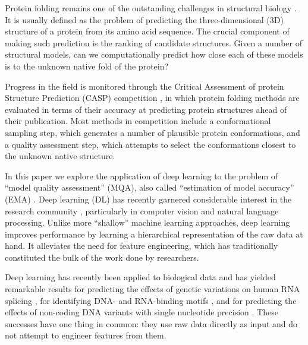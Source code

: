 
Protein folding remains one of the outstanding challenges in
structural biology \cite{dill2012folding}. 
It is usually defined as the problem of predicting the three-dimensional (3D) structure of a
protein from its amino acid sequence. The crucial component of making such prediction is 
the ranking of candidate structures. Given a number of structural models, 
can we computationally predict how close each of these models is to the unknown native fold of the protein?

Progress in the field is monitored through the Critical Assessment of
protein Structure Prediction (CASP) competition \cite{moult1995large},
in which protein folding methods are evaluated in terms of their
accuracy at predicting protein structures ahead of their
publication. Most methods in competition include a conformational
sampling step, which generates a number of plausible protein
conformations, and a quality assessment step, which attempts to select
the conformations closest to the unknown native structure.

In this paper we explore the application of deep learning to the
problem of ``model quality assessment'' (MQA), also called
``estimation of model accuracy'' (EMA) \cite{kryshtafovych2015}. Deep
learning (DL) has recently garnered considerable interest in the
research community \cite{lecun2015deep}, particularly in computer
vision and natural language processing. Unlike more ``shallow''
machine learning approaches, deep learning improves performance by
learning a hierarchical representation of the raw data at hand. It
alleviates the need for feature engineering, which has traditionally
constituted the bulk of the work done by researchers.

Deep learning has recently been applied to biological data and has
yielded remarkable results for predicting the effects of genetic
variations on human RNA splicing \cite{xiong2015human}, for
identifying DNA- and RNA-binding
motifs \cite{alipanahi2015predicting}, and for predicting the effects
of non-coding DNA variants with single nucleotide
precision \cite{zhou2015predicting}. These successes have one thing in
common: they use raw data directly as input and do not attempt to
engineer features from them.


